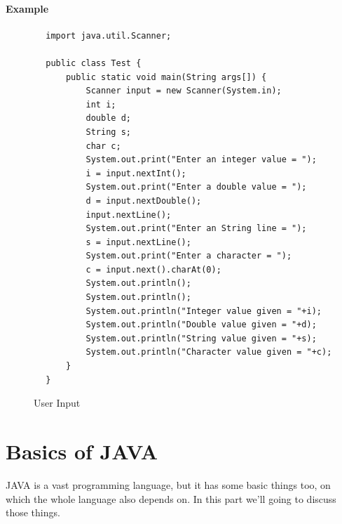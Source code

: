 \documentclass[openany]{book}  %
\begin{document}
\subsection{Example}
\begin{center}
    \begin{verbatim}
        import java.util.Scanner;

        public class Test {
            public static void main(String args[]) {
                Scanner input = new Scanner(System.in);
                int i;
                double d;
                String s;
                char c;
                System.out.print("Enter an integer value = ");
                i = input.nextInt();
                System.out.print("Enter a double value = ");
                d = input.nextDouble();
                input.nextLine();
                System.out.print("Enter an String line = ");
                s = input.nextLine();
                System.out.print("Enter a character = ");
                c = input.next().charAt(0);
                System.out.println();
                System.out.println();
                System.out.println("Integer value given = "+i);
                System.out.println("Double value given = "+d);
                System.out.println("String value given = "+s);
                System.out.println("Character value given = "+c);
            }
        }
    \end{verbatim}
\end{center}
% 
% 
\begin{figure}[htbp]
    \begin{center}
        \caption{User Input\cite{Ref7}\cite{Ref3}}
    \end{center}
\end{figure}

% 
% 
\part{Basics of JAVA}
\vspace*{\fill}
JAVA is a vast programming language, but it has some basic things too, on \\
which the whole language also depends on. In this part we'll going to discuss \\
those things.
\vspace*{\fill}
% 
% 
\end{document}

